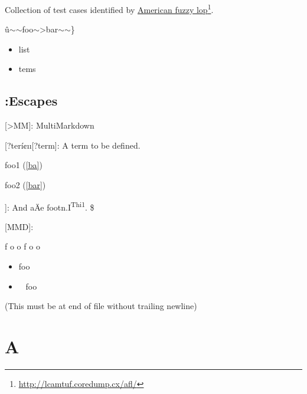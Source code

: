 
\def\mytitle{Fuzz Testing}


Collection of test cases identified by \href{http://lcamtuf.coredump.cx/afl/}{American fuzzy lop}\footnote{\href{http://lcamtuf.coredump.cx/afl/}{http://lcamtuf.coredump.cx/afl/}}.

û\ensuremath{\sim}\ensuremath{\sim}foo\ensuremath{\sim}>bar\ensuremath{\sim}\ensuremath{\sim}\}

\begin{itemize}
\item list
\item tems
\end{itemize}

\chapter{:Escapes}
\label{escaped}

[>MM]: MultiMarkdown

[?terí¢ıı[?term]: A term to be defined.

foo1 (\autoref{ba})

foo2 (\autoref{bar})

]: And aÄe footn.I\textsuperscript{Thi1}. \$

[MMD]:

f\gls{ o o} f\gls{ o o}

\begin{itemize}
\item foo
\item   foo
\end{itemize}

(This must be at end of file without trailing newline)

\part{A}
\label{a}


